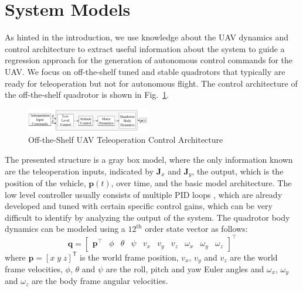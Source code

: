 \documentclass[letterpaper, 10 pt, conference]{ieeeconf}  %
\newcommand\NB[1]{$\spadesuit$\footnote{NB: #1}}
\begin{document}
\section{System Models} \label{sec:sysdyn}
As hinted in the introduction, we use knowledge about the UAV dynamics and control architecture to extract useful information about the system to guide a regression approach for the generation of autonomous control commands for the UAV. We focus on off-the-shelf tuned and stable quadrotors that typically are ready for teleoperation but not for autonomous flight. The control architecture of the off-the-shelf quadrotor is shown in Fig.~\ref{fig:otsctrl}.
\begin{figure}[ht]
    \includegraphics[width=0.48\textwidth]{finalfigs/ctrler.png}
    \caption{Off-the-Shelf UAV Teleoperation Control Architecture}
    \label{fig:otsctrl}
\end{figure}
The presented structure is a gray box model, where the only information known are the teleoperation inputs, indicated by $\bm{J}_x$ and $\bm{J}_y$, the output, which is the position of the vehicle, $\bm{p}(t)$, over time, and the basic model architecture. The low level controller usually consists of multiple PID loops \cite{esen}, which are already developed and tuned with certain specific control gains, which can be very difficult to identify by analyzing the output of the system. The quadrotor body dynamics can be modeled using a $12^{\text{th}}$ order state vector as follows:
\begin{equation}
    \bm{q} = 
    \begin{bmatrix}
    \bm{p}^\intercal & \phi & \theta & \psi & v_x & v_y & v_z & \omega_x & \omega_y & \omega_z
    \end{bmatrix}^\intercal \nonumber
\end{equation} 
where $\bm{p}=[x \; y \; z]^{\mathsf{T}}$ is the world frame position, $v_{x}$, $v_{y}$ and $v_z$ are the world frame velocities, $\phi$, $\theta$ and $\psi$ are the roll, pitch and yaw Euler angles and $\omega_{x}$, $\omega_{y}$ and $\omega_{z}$ are the body frame angular velocities.
\end{document}
